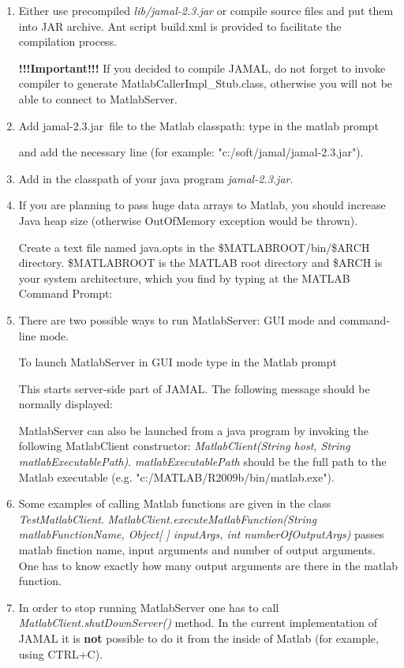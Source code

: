 \documentclass[a4paper,twoside,12pt]{report}
\def\version{2.3}
\def\jarName{jamal-\version.jar}
\begin{document}
\begin{enumerate}
	\item   Either use precompiled \emph{lib/\jarName} or compile source files and put them into JAR archive. Ant script build.xml is provided to facilitate the compilation process. 

\textbf{!!!Important!!!} If you decided to compile JAMAL, do not forget to invoke  compiler to generate MatlabCallerImpl\_Stub.class, otherwise you will not be able to connect to MatlabServer.  
	\item 	Add \jarName~file to the Matlab classpath: type in the matlab prompt  


	 and add the necessary line (for example: "c:/soft/jamal/\jarName").
	
		
	\item 	Add in the classpath of your java program \emph{\jarName}.
	
	\item If you are planning to pass huge data arrays to Matlab, you should increase Java heap size (otherwise OutOfMemory exception would be thrown). 

Create a text file named java.opts in the \$MATLABROOT/bin/\$ARCH directory. \$MATLABROOT is the MATLAB root directory and \$ARCH is your system architecture, which you find by typing at the MATLAB Command Prompt: 

	\item 	
	There are two possible ways to run MatlabServer: GUI mode and command-line mode. 
	
	To launch MatlabServer in GUI mode type in the Matlab prompt 


  This starts server-side part of JAMAL. The following message should be normally displayed: 
  	
			
	MatlabServer can also be launched from a java program by invoking the following MatlabClient constructor: \textit{MatlabClient(String host, String matlabExecutablePath)}. \textit{matlabExecutablePath} should be the full path to the Matlab executable (e.g. "c:/MATLAB/R2009b/bin/matlab.exe"). 

	\item 	Some examples of calling Matlab functions are given in the class \textit{TestMatlabClient}. 
	\textit{MatlabClient.executeMatlabFunction(String matlabFunctionName, Object[ ] inputArgs, int numberOfOutputArgs)} passes matlab finction name, input arguments and number of output arguments. One has to know exactly how many output arguments are there in the matlab function.
	\item		In order to stop running MatlabServer one has to call \textit{MatlabClient.shutDownServer()} method. In the current implementation of JAMAL it is \textbf{not} possible to do it from the inside of Matlab (for example, using CTRL+C). 
	

\end{enumerate}
\end{document}
